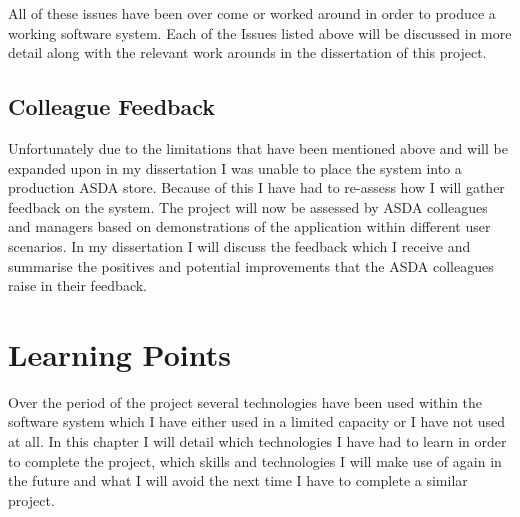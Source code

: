 \documentclass[a4paper,11pt]{report}
\begin{document}
All of these issues have been over come or worked around in order to produce a working software system. Each of the Issues listed above will be discussed in more detail along with the relevant work arounds in the dissertation of this project.


\section{Colleague Feedback}
Unfortunately due to the limitations that have been mentioned above and will be expanded upon in my dissertation I was unable to place the system into a production ASDA store.
Because of this I have had to re-assess how I will gather feedback on the system. The project will now be assessed by ASDA colleagues and managers based on demonstrations of the application within different user scenarios. 
In my dissertation I will discuss the feedback which I receive and summarise the positives and potential improvements that the ASDA colleagues raise in their feedback.


\chapter{Learning Points}
Over the period of the project several technologies have been used within the software system
which I have either used in a limited capacity or I have not used at all. In this chapter I will
detail which technologies I have had to learn in order to complete the project, which skills and 
technologies I will make use of again in the future and what I will avoid the next time I have to 
complete a similar project.

\end{document}
